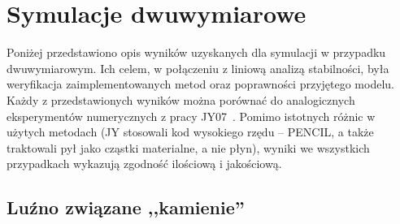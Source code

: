 
\section{Symulacje dwuwymiarowe}
Poniżej przedstawiono opis wyników uzyskanych dla symulacji w przypadku
dwuwymiarowym. Ich celem, w połączeniu z liniową analizą stabilności, była
weryfikacja zaimplementowanych metod oraz poprawności przyjętego modelu. Każdy z
przedstawionych wyników można porównać do analogicznych eksperymentów
numerycznych z pracy JY07~\cite{JY07}. Pomimo istotnych różnic w użytych
metodach (JY stosowali kod wysokiego rzędu -- PENCIL, a także traktowali pył
jako cząstki materialne, a nie płyn), wyniki we wszystkich przypadkach wykazują
zgodność ilościową i jakościową.

\subsection{Luźno związane ,,kamienie''}%

